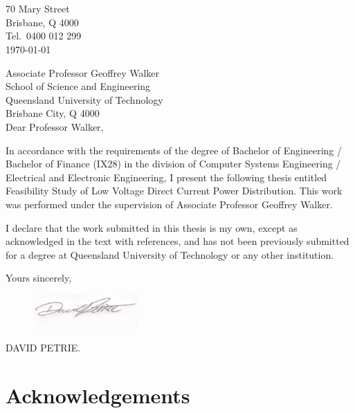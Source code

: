 \newpage


\section*{}

\begin{flushright}
	70 Mary Street\\
	Brisbane, Q 4000\\
	Tel.\ 0400 012 299\\
	\medskip
	\today
\end{flushright}
\begin{flushleft}
  Associate Professor Geoffrey Walker\\
  School of Science and Engineering\\
  Queensland University of Technology\\
  Brisbane City, Q 4000\\
  \bigskip\bigskip
  Dear Professor Walker,
\end{flushleft}

In accordance with the requirements of the degree of Bachelor of
Engineering / Bachelor of Finance (IX28) in the division of Computer Systems
Engineering / Electrical and Electronic Engineering, I present the
following thesis entitled Feasibility Study of Low Voltage Direct Current Power Distribution.  This work was performed under the supervision of Associate Professor Geoffrey Walker.

I declare that the work submitted in this thesis is my own, except as
acknowledged in the text with references, and has not been previously
submitted for a degree at Queensland University of Technology or any other
institution.

\begin{flushright}
	Yours sincerely,\\
	\medskip
	\begin{figure}[H]
	\hfill\includegraphics[width = 40mm]{images/Signature.JPG}%
	\end{figure} 
	\medskip
	DAVID PETRIE.
\end{flushright}

\newpage

\section*{Acknowledgements}


